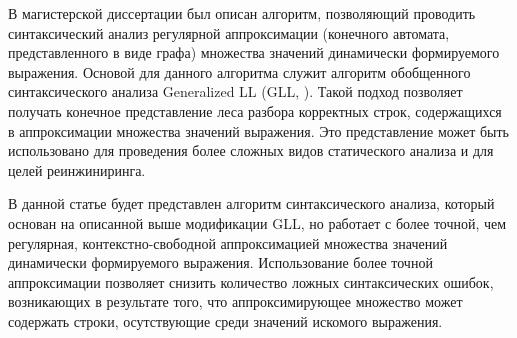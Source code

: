 В магистерской диссертации \cite{kovalev-spbu-gll_reg} был описан алгоритм, позволяющий проводить синтаксический анализ регулярной аппроксимации (конечного автомата, представленного в виде графа) множества значений динамически формируемого выражения. Основой для данного алгоритма служит алгоритм обобщенного синтаксического анализа Generalized LL (GLL, \cite{kovalev-spbu-gll}).
Такой подход позволяет получать конечное представление леса разбора \cite{kovalev-spbu-sppf} корректных строк, содержащихся в аппроксимации множества значений выражения. Это представление может быть использовано для проведения более сложных видов статического анализа и для целей реинжиниринга.

В данной статье будет представлен алгоритм синтаксического анализа, который основан на описанной выше модификации GLL, но работает с более точной, чем регулярная, контекстно-свободной аппроксимацией множества значений динамически формируемого выражения. 
Использование более точной аппроксимации позволяет снизить количество ложных синтаксических ошибок, возникающих в результате того, что аппроксимирующее множество может содержать строки, осутствующие среди значений искомого выражения.